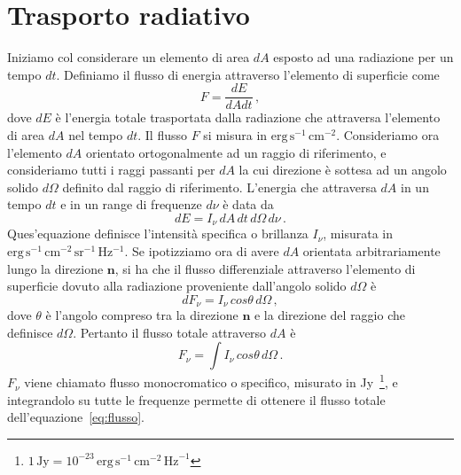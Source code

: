 \section{Trasporto radiativo}
Iniziamo col considerare un elemento di area $dA$ esposto ad una radiazione per un tempo $dt$. Definiamo il flusso di energia attraverso l'elemento di superficie come 
\begin{equation}
F=\frac{dE}{dA dt} \, ,
\label{eq:flusso}
\end{equation}
dove $dE$ è l'energia totale trasportata dalla radiazione %
che attraversa l'elemento di area $dA$ nel tempo $dt$. Il flusso $F$ si misura in $\mathrm{erg\,s^{-1}\,cm^{-2}}$. Consideriamo ora l'elemento $dA$ orientato ortogonalmente ad un raggio di riferimento, e consideriamo tutti i raggi passanti per $dA$ la cui direzione è sottesa ad un angolo solido $d\Omega$ definito dal raggio di riferimento. L'energia che attraversa $dA$ in un tempo $dt$ e in un range di frequenze $d\nu$ è data da
\begin{equation}
dE=I_{\nu}\,dA\,dt\,d\Omega\,d\nu \, .
\label{eq:brillanza}
\end{equation}
Ques'equazione definisce l'intensità specifica o brillanza $I_{\nu}$, misurata in $\mathrm{erg\,s^{-1}\,cm^{-2}\,sr^{-1}\,Hz^{-1}}$. Se ipotizziamo ora di avere  $dA$ orientata arbitrariamente lungo la direzione $\textbf{n}$, si ha che il flusso differenziale attraverso l'elemento di superficie dovuto alla radiazione proveniente dall'angolo solido $d\Omega$ è 
\begin{equation}
dF_{\nu}=I_{\nu}\,cos{\theta}\,d\Omega\, ,
\label{eq:dflusso}
\end{equation}
dove $\theta$ è l'angolo compreso tra la direzione $\textbf{n}$ e la direzione del raggio che definisce $d\Omega$. Pertanto il flusso totale attraverso $dA$ è 
\begin{equation}
F_{\nu}=\int{I_{\nu}\,cos{\theta}\,d\Omega}\, .
\label{eq:Fintegrale}
\end{equation}
$F_{\nu}$ viene chiamato flusso monocromatico o specifico, misurato in Jy~\footnote{$1\, \mathrm{Jy} = 10^{-23}\,\mathrm{erg}\,\mathrm{s}^{-1}\,\mathrm{cm}^{-2}\,\mathrm{Hz}^{-1}$}, e integrandolo su tutte le frequenze permette di ottenere il flusso totale dell'equazione~\ref{eq:flusso}. 

